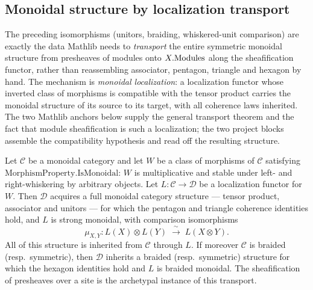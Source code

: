 \subsection{Monoidal structure by localization transport}
\label{mk-subsec:sgr_monoidal_localization}

The preceding isomorphisms (unitors, braiding, whiskered-unit comparison) are
exactly the data Mathlib needs to \emph{transport} the entire symmetric monoidal
structure from presheaves of modules onto \(X.\mathrm{Modules}\) along the sheafification
functor, rather than reassembling associator, pentagon, triangle and hexagon by
hand. The mechanism is \emph{monoidal localization}: a localization functor whose
inverted class of morphisms is compatible with the tensor product carries the
monoidal structure of its source to its target, with all coherence laws inherited.
The two Mathlib anchors below supply the general transport theorem and the fact
that module sheafification is such a localization; the two project blocks assemble
the compatibility hypothesis and read off the resulting structure.

\begin{lemma}
  \label{mk-lem:monoidalLocalization_mathlib}
  \mathlibok

  Let \(\mathcal{C}\) be a monoidal category and let \(W\) be a class of morphisms
  of \(\mathcal{C}\) satisfying \(\mathrm{MorphismProperty.IsMonoidal}\): \(W\) is
  multiplicative and stable under left- and right-whiskering by arbitrary objects.
  Let \(L : \mathcal{C} \to \mathcal{D}\) be a
  localization functor for \(W\). Then \(\mathcal{D}\) acquires a full monoidal
  category structure --- tensor product, associator and unitors --- for which the
  pentagon and triangle coherence identities hold, and \(L\) is strong monoidal,
  with comparison isomorphisms
  \[
    \mu_{X,Y} : L(X) \otimes L(Y) \;\xrightarrow{\ \sim\ }\; L(X \otimes Y).
  \]
  All of this structure is inherited from \(\mathcal{C}\) through \(L\). If moreover
  \(\mathcal{C}\) is braided (resp.\ symmetric), then \(\mathcal{D}\) inherits a
  braided (resp.\ symmetric) structure for which the hexagon identities hold and
  \(L\) is braided monoidal. The sheafification of presheaves over a site is the
  archetypal instance of this transport.
\end{lemma}

